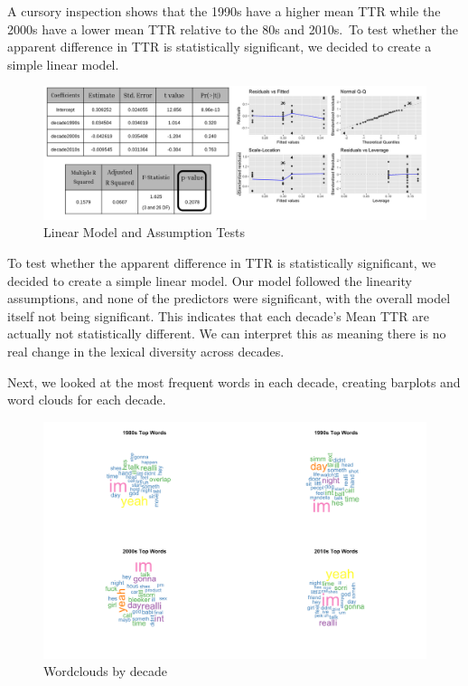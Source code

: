 \documentclass[
  authoryear,
  preprint]{elsarticle}
\begin{document}
A cursory inspection shows that the 1990s have a higher mean TTR while
the 2000s have a lower mean TTR relative to the 80s and 2010s.~To test
whether the apparent difference in TTR is statistically significant, we
decided to create a simple linear model.

\begin{figure}[H]

{\centering \includegraphics{images/Screenshot 2025-03-21 at 16-45-10 STATS 133 Are Romcoms Dead - Google Slides.png}

}

\caption{Linear Model and Assumption Tests}

\end{figure}%

To test whether the apparent difference in TTR is statistically
significant, we decided to create a simple linear model. Our model
followed the linearity assumptions, and none of the predictors were
significant, with the overall model itself not being significant. This
indicates that each decade's Mean TTR are actually not statistically
different. We can interpret this as meaning there is no real change in
the lexical diversity across decades.

Next, we looked at the most frequent words in each decade, creating
barplots and word clouds for each decade.

\begin{figure}[H]

{\centering \includegraphics{images/wc4-imageonline.co-merged-imageonline.co-merged.png}

}

\caption{Wordclouds by decade}

\end{figure}%
\end{document}
